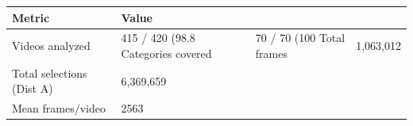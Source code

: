\begin{tabular}{ll}
\toprule
Metric & Value \\
\midrule
Videos analyzed & 415 / 420 (98.8%
Categories covered & 70 / 70 (100%
Total frames & 1,063,012 \\
Total selections (Dist A) & 6,369,659 \\
Mean frames/video & 2563 \\
\bottomrule
\end{tabular}
